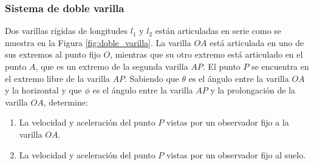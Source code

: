 \subsubsection{Sistema de doble varilla}
Dos varillas rígidas de longitudes $l_1$ y $l_2$ están articuladas en serie como se muestra en la Figura \ref{fig:doble_varilla}. La varilla $OA$ está articulada en uno de sus extremos al punto fijo $O$, mientras que su otro extremo está articulado en el punto $A$, que es un extremo de la segunda varilla $AP$. El punto $P$ se encuentra en el extremo libre de la varilla $AP$. Sabiendo que $\theta$ es el ángulo entre la varilla $OA$ y la horizontal y que $\phi$ es el ángulo entre la varilla $AP$ y la prolongación de la varilla $OA$, determine:

\begin{enumerate}
    \item La velocidad y aceleración del punto $P$ vistas por un observador fijo a la varilla $OA$.
    \item La velocidad y aceleración del punto $P$ vistas por un observador fijo al suelo.
\end{enumerate}

